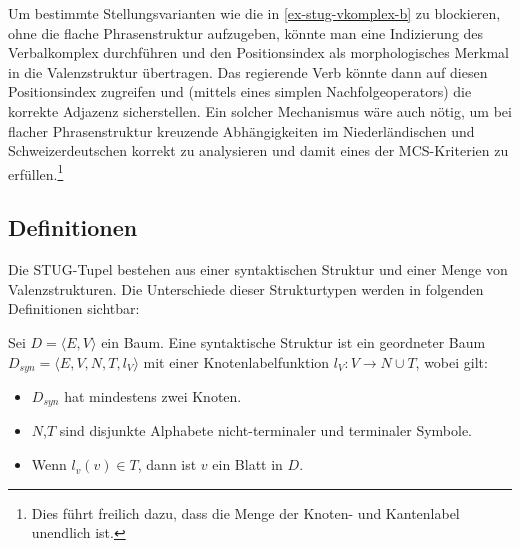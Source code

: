Um bestimmte Stellungsvarianten wie die in \ref{ex-stug-vkomplex-b} zu blockieren, ohne die flache Phrasenstruktur aufzugeben, könnte man eine Indizierung des Verbalkomplex durchführen und den Positionsindex als morphologisches Merkmal in die Valenzstruktur übertragen. Das regierende Verb könnte dann auf diesen Positionsindex zugreifen und (mittels eines simplen Nachfolgeoperators) die korrekte Adjazenz sicherstellen. Ein solcher Mechanismus wäre auch nötig, um bei flacher Phrasenstruktur kreuzende Abhängigkeiten im Niederländischen und Schweizerdeutschen korrekt zu analysieren und damit eines der MCS-Kriterien zu erfüllen.\footnote{Dies führt freilich dazu, dass die Menge der Knoten- und Kantenlabel unendlich ist.}


\subsection{Definitionen}

Die STUG-Tupel bestehen aus einer syntaktischen Struktur und einer Menge von Valenzstrukturen. Die Unterschiede dieser Strukturtypen werden in folgenden Definitionen sichtbar:

\begin{definition} Sei $D = \langle E,V \rangle$ ein Baum. Eine syntaktische Struktur ist ein geordneter Baum $D_{\mathit{syn}} = \langle E,V,N,T,l_V \rangle$ mit einer Knotenlabelfunktion $l_V: V \to N\cup T$, wobei gilt:
\begin{itemize}
  \item $D_{\mathit{syn}}$ hat mindestens zwei Knoten.
  \item $N$,$T$ sind disjunkte Alphabete nicht-terminaler und terminaler Symbole.
  \item Wenn $l_v(v) \in T$, dann ist $v$ ein Blatt in $D$.
\end{itemize} 
\end{definition}

